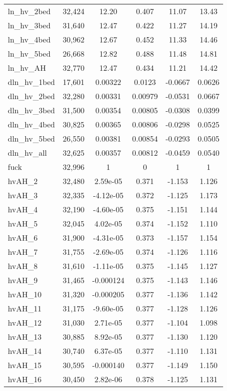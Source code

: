 \begin{tabular}{lccccc}
ln\_hv\_2bed & 32,424 & 12.20 & 0.407 & 11.07 & 13.43 \\
ln\_hv\_3bed & 31,640 & 12.47 & 0.422 & 11.27 & 14.19 \\
ln\_hv\_4bed & 30,962 & 12.67 & 0.452 & 11.33 & 14.46 \\
ln\_hv\_5bed & 26,668 & 12.82 & 0.488 & 11.48 & 14.81 \\
ln\_hv\_AH & 32,770 & 12.47 & 0.434 & 11.21 & 14.42 \\
dln\_hv\_1bed & 17,601 & 0.00322 & 0.0123 & -0.0667 & 0.0626 \\
dln\_hv\_2bed & 32,280 & 0.00331 & 0.00979 & -0.0531 & 0.0667 \\
dln\_hv\_3bed & 31,500 & 0.00354 & 0.00805 & -0.0308 & 0.0399 \\
dln\_hv\_4bed & 30,825 & 0.00365 & 0.00806 & -0.0298 & 0.0525 \\
dln\_hv\_5bed & 26,550 & 0.00381 & 0.00854 & -0.0293 & 0.0505 \\
dln\_hv\_all & 32,625 & 0.00357 & 0.00812 & -0.0459 & 0.0540 \\
fuck & 32,996 & 1 & 0 & 1 & 1 \\
hvAH\_2 & 32,480 & 2.59e-05 & 0.371 & -1.153 & 1.126 \\
hvAH\_3 & 32,335 & -4.12e-05 & 0.372 & -1.125 & 1.173 \\
hvAH\_4 & 32,190 & -4.60e-05 & 0.375 & -1.151 & 1.144 \\
hvAH\_5 & 32,045 & 4.02e-05 & 0.374 & -1.152 & 1.110 \\
hvAH\_6 & 31,900 & -4.31e-05 & 0.373 & -1.157 & 1.154 \\
hvAH\_7 & 31,755 & -2.69e-05 & 0.374 & -1.126 & 1.116 \\
hvAH\_8 & 31,610 & -1.11e-05 & 0.375 & -1.145 & 1.127 \\
hvAH\_9 & 31,465 & -0.000124 & 0.375 & -1.143 & 1.146 \\
hvAH\_10 & 31,320 & -0.000205 & 0.377 & -1.136 & 1.142 \\
hvAH\_11 & 31,175 & -9.60e-05 & 0.377 & -1.128 & 1.126 \\
hvAH\_12 & 31,030 & 2.71e-05 & 0.377 & -1.104 & 1.098 \\
hvAH\_13 & 30,885 & 8.92e-05 & 0.377 & -1.130 & 1.120 \\
hvAH\_14 & 30,740 & 6.37e-05 & 0.377 & -1.110 & 1.131 \\
hvAH\_15 & 30,595 & -0.000140 & 0.377 & -1.149 & 1.150 \\
hvAH\_16 & 30,450 & 2.82e-06 & 0.378 & -1.125 & 1.131 \\

\end{tabular}
